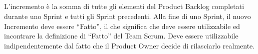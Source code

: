 
\subsection*{\color{SteelBlue}{Incremento}}
\label{sec:increment}
L'incremento \`e la somma di tutte gli elementi del Product Backlog completati durante uno 
Sprint e tutti gli Sprint precedenti. Alla fine di uno Sprint, il nuovo Incremento deve 
essere ``Fatto'', il che significa che deve essere utilizzabile ed incontrare la 
definizione di ``Fatto'' del Team Scrum. Deve essere utilizzabile indipendentemente dal 
fatto che il Product Owner decide di rilasciarlo realmente.

